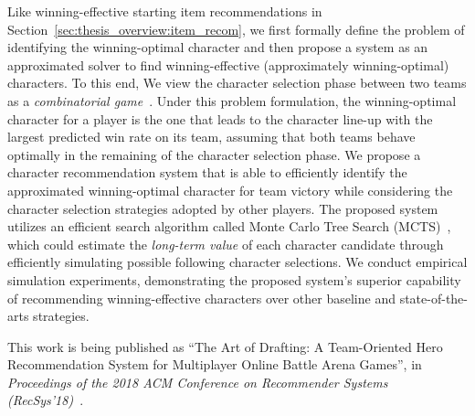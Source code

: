 Like winning-effective starting item recommendations in Section~\ref{sec:thesis_overview:item_recom}, we first formally define the problem of identifying the winning-optimal character and then propose a system as an approximated solver to find winning-effective (approximately winning-optimal) characters. To this end, We view the character selection phase between two teams as a \textit{combinatorial game}~\cite{browne2012survey}. Under this problem formulation, the winning-optimal character for a player is the one that leads to the character line-up with the largest predicted win rate on its team, assuming that both teams behave optimally in the remaining of the character selection phase.  We propose a character recommendation system that is able to efficiently identify the approximated winning-optimal character for team victory while considering the character selection strategies adopted by other players. The proposed system utilizes an efficient search algorithm called Monte Carlo Tree Search (MCTS)~\cite{kocsis2006bandit}, which could estimate the \textit{long-term value} of each character candidate through efficiently simulating possible following character selections. We conduct empirical simulation experiments, demonstrating the proposed system's superior capability of recommending winning-effective characters over other baseline and state-of-the-arts strategies. 

This work is being published as ``The Art of Drafting: A Team-Oriented Hero Recommendation System for Multiplayer Online Battle Arena Games'', in \textit{Proceedings of the 2018 ACM Conference on Recommender Systems (RecSys'18)}~\cite{chen2018draft}.





